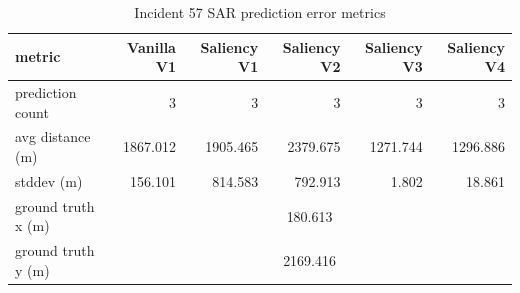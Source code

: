 \begin{table}[ht]
\centering
\caption{Incident 57 SAR prediction error metrics}
\label{tab:sar-incident-57}
\begin{tabular}{lrrrrr}
\hline
metric & Vanilla V1 & Saliency V1 & Saliency V2 & Saliency V3 & Saliency V4 \\
\hline
prediction count & 3 & 3 & 3 & 3 & 3 \\
avg distance (m) & 1867.012 & 1905.465 & 2379.675 & 1271.744 & 1296.886 \\
stddev (m) & 156.101 & 814.583 & 792.913 & 1.802 & 18.861 \\
ground truth x (m) & \multicolumn{5}{c}{180.613} \\
ground truth y (m) & \multicolumn{5}{c}{2169.416} \\
\hline
\end{tabular}
\end{table}
